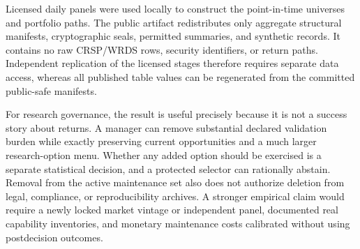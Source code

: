 Licensed daily panels were used locally to construct the point-in-time
universes and portfolio paths. The public artifact redistributes only aggregate
structural manifests, cryptographic seals, permitted summaries, and synthetic
records. It contains no raw CRSP/WRDS rows, security identifiers, or return
paths. Independent replication of the licensed stages therefore requires
separate data access, whereas all published table values can be regenerated
from the committed public-safe manifests.

For research governance, the result is useful precisely because it is not a
success story about returns. A manager can remove substantial declared
validation burden while exactly preserving current opportunities and a much
larger research-option menu. Whether any added option should be exercised is a
separate statistical decision, and a protected selector can rationally abstain.
Removal from the active maintenance set also does not authorize deletion from
legal, compliance, or reproducibility archives. A stronger empirical claim
would require a newly locked market vintage or independent panel, documented
real capability inventories, and monetary maintenance costs calibrated without
using postdecision outcomes.
